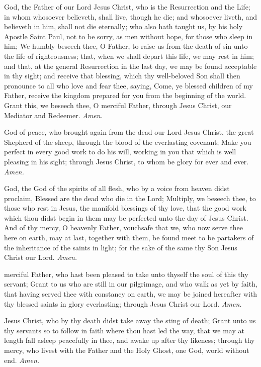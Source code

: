  God, the Father of our Lord Jesus Christ, who is the Resurrection and the Life; in whom whosoever believeth, shall live, though he die; and whosoever liveth, and believeth in him, shall not die eternally; who also hath taught us, by his holy Apostle Saint Paul, not to be sorry, as men without hope, for those who sleep in him; We humbly beseech thee, O Father, to raise us from the death of sin unto the life of righteousness; that, when we shall depart this life, we may rest in him; and that, at the general Resurrection in the last day, we may be found acceptable in thy sight; and receive that blessing, which thy well-beloved Son shall then pronounce to all who love and fear thee, saying, Come, ye blessed children of my Father, receive the kingdom prepared for you from the beginning of the world. Grant this, we beseech thee, O merciful Father, through Jesus Christ, our Mediator and Redeemer. \textit{Amen.}\par

 God of peace, who brought again from the dead our Lord Jesus Christ, the great Shepherd of the sheep, through the blood of the everlasting covenant; Make you perfect in every good work to do his will, working in you that which is well pleasing in his sight; through Jesus Christ, to whom be glory for ever and ever. \textit{Amen.}

 God, the God of the spirits of all flesh, who by a voice from heaven didst proclaim, Blessed are the dead who die in the Lord; Multiply, we beseech thee, to those who rest in Jesus, the manifold blessings of thy love, that the good work which thou didst begin in them may be perfected unto the day of Jesus Christ. And of thy mercy, O heavenly Father, vouchsafe that we, who now serve thee here on earth, may at last, together with them, be found meet to be partakers of the inheritance of the saints in light; for the sake of the same thy Son Jesus Christ our Lord. \textit{Amen.}\par

 merciful Father, who hast been pleased to take unto thyself the soul of this thy servant; Grant to us who are still in our pilgrimage, and who walk as yet by faith, that having served thee with constancy on earth, we may be joined hereafter with thy blessed saints in glory everlasting; through Jesus Christ our Lord. \textit{Amen.}\par

 Jesus Christ, who by thy death didst take away the sting of death; Grant unto us thy servants so to follow in faith where thou hast led the way, that we may at length fall asleep peacefully in thee, and awake up after thy likeness; through thy mercy, who livest with the Father and the Holy Ghost, one God, world without end. \textit{Amen.}\par

